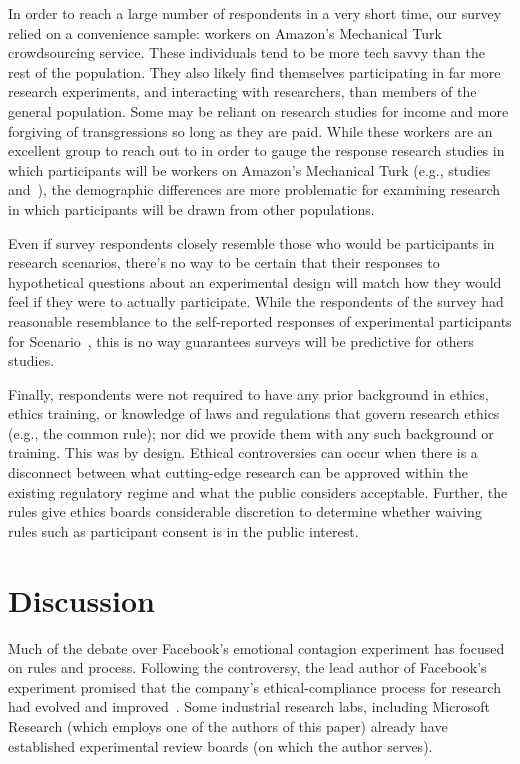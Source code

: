 In order to reach a large number of respondents in a very short time, our survey relied on a convenience sample: workers on Amazon's Mechanical Turk crowdsourcing service.  These individuals tend to be more tech savvy than the rest of the population.  They also likely find themselves participating in far more research experiments, and interacting with researchers, than members of the general population.  Some may be reliant on research studies for income and more forgiving of transgressions so long as they are paid.  While these workers are an excellent group to reach out to in order to gauge the response research studies in which participants will be workers on Amazon's Mechanical Turk (e.g., studies~ and~), the demographic differences are more problematic for examining research in which participants will be drawn from other populations.

Even if survey respondents closely resemble those who would be participants in research scenarios, there's no way to be certain that their responses to hypothetical questions about an experimental design will match how they would feel if they were to actually participate.  While the respondents of the survey had reasonable resemblance to the self-reported responses of experimental participants for Scenario~, this is no way guarantees surveys will be predictive for others studies.

Finally, respondents were not required to have any prior background in ethics, ethics training, or knowledge of laws and regulations that govern research ethics (e.g., the common rule); nor did we provide them with any such background or training.  This was by design.  Ethical controversies can occur when there is a disconnect between what cutting-edge research can be approved within the existing regulatory regime and what the public considers acceptable.  Further, the rules give ethics boards considerable discretion to determine whether waiving rules such as participant consent is in the public interest.

\section{Discussion}
Much of the debate over Facebook's emotional contagion experiment has focused on rules and process. Following the controversy, the lead author of Facebook's experiment promised that the company's ethical-compliance process for research had evolved and improved~\cite{Kramer2014:ResponseToControversy}. Some industrial research labs, including Microsoft Research (which employs one of the authors of this paper) already have established experimental review boards (on which the author serves).

